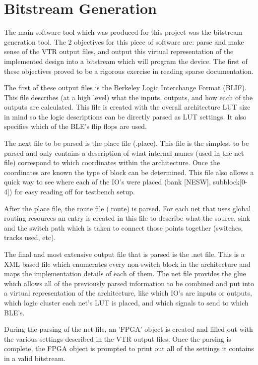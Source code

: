 \documentclass[12pt]{article}
\begin{document}
\newpage
\section{Bitstream Generation}\label{sec:bitstream}

The main software tool which was produced for this project was the bitstream generation
tool. The 2 objectives for this piece of software are: parse and make sense of the VTR
output files, and output this virtual representation of the implemented design into a
bitstream which will program the device. The first of these objectives proved to be a
rigorous exercise in reading sparse documentation.

The first of these output files is the Berkeley Logic Interchange Format (BLIF).
This file describes (at a high level) what the inputs, outputs, and how each of the outputs
are calculated. This
file is created with the overall architecture LUT size in mind so the logic descriptions
can be directly parsed as LUT settings. It also specifies which of the BLE's flip flops are
used.

The next file to be parsed is the place file (.place). This file is the simplest to be
parsed and only contains a description of what internal names (used in the net file)
correspond to which coordinates within the architecture. Once the coordinates are known
the type of block can be determined. This file also allows a quick way to see where each
of the IO's were placed (bank [NESW], subblock[0-4]) for easy reading off for testbench
setup.

After the place file, the route file (.route) is parsed. For each net that uses global
routing resources an entry is created in this file to describe what the source, sink and
the switch path which is taken to connect those points together (switches, tracks used, etc).

The final and most extensive output file that is parsed is the .net file. This is a XML based
file which enumerates
every non-switch block in the architecture and maps the implementation details of each of them.
The net file provides the glue which allows all of the previously parsed information to be
combined and put into a virtual representation of the architecture, like which IO's are
inputs or outputs, which logic cluster each net's LUT is placed, and which signals to send
to which BLE's.

During the parsing of the net file, an 'FPGA' object is created and filled out with
the various settings described in the VTR output files. Once the parsing is complete,
the FPGA object is prompted to print out all of the settings it contains in a valid bitstream.
\end{document}
